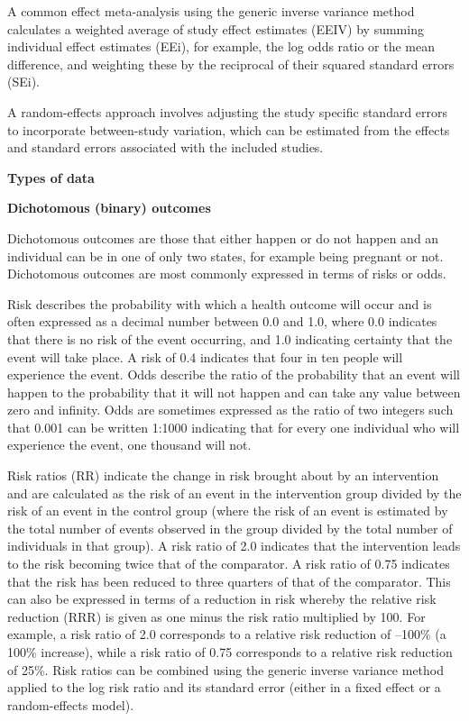 \documentclass[
  11pt,
  a4paper,
  DIV=11,
  numbers=noendperiod]{scrreprt}
\begin{document}
A common effect meta-analysis using the generic inverse variance method
calculates a weighted average of study effect estimates (EEIV) by
summing individual effect estimates (EEi), for example, the log odds
ratio or the mean difference, and weighting these by the reciprocal of
their squared standard errors (SEi).

A random-effects approach involves adjusting the study specific standard
errors to incorporate between-study variation, which can be estimated
from the effects and standard errors associated with the included
studies.

\textbf{Types of data}

\textbf{Dichotomous (binary) outcomes}

Dichotomous outcomes are those that either happen or do not happen and
an individual can be in one of only two states, for example being
pregnant or not. Dichotomous outcomes are most commonly expressed in
terms of risks or odds.

Risk describes the probability with which a health outcome will occur
and is often expressed as a decimal number between 0.0 and 1.0, where
0.0 indicates that there is no risk of the event occurring, and 1.0
indicating certainty that the event will take place. A risk of 0.4
indicates that four in ten people will experience the event. Odds
describe the ratio of the probability that an event will happen to the
probability that it will not happen and can take any value between zero
and infinity. Odds are sometimes expressed as the ratio of two integers
such that 0.001 can be written 1:1000 indicating that for every one
individual who will experience the event, one thousand will not.

Risk ratios (RR) indicate the change in risk brought about by an
intervention and are calculated as the risk of an event in the
intervention group divided by the risk of an event in the control group
(where the risk of an event is estimated by the total number of events
observed in the group divided by the total number of individuals in that
group). A risk ratio of 2.0 indicates that the intervention leads to the
risk becoming twice that of the comparator. A risk ratio of 0.75
indicates that the risk has been reduced to three quarters of that of
the comparator. This can also be expressed in terms of a reduction in
risk whereby the relative risk reduction (RRR) is given as one minus the
risk ratio multiplied by 100. For example, a risk ratio of 2.0
corresponds to a relative risk reduction of --100\% (a 100\% increase),
while a risk ratio of 0.75 corresponds to a relative risk reduction of
25\%. Risk ratios can be combined using the generic inverse variance
method applied to the log risk ratio and its standard error (either in a
fixed effect or a random-effects model).
\end{document}
